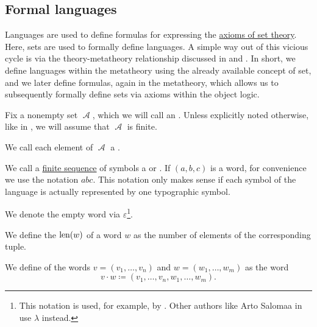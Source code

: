 \subsection{Formal languages}\label{subsec:formal_languages}

Languages are used to define formulas for expressing the \hyperref[def:zfc]{axioms of set theory}. Here, sets are used to formally define languages. A simple way out of this vicious cycle is via the theory-metatheory relationship discussed in  and . In short, we define languages within the metatheory using the already available concept of set, and we later define formulas, again in the metatheory, which allows us to subsequently formally define sets via axioms within the object logic.

\begin{definition}\label{def:formal_language}
  Fix a nonempty set \( \mscrA \), which we will call an . Unless explicitly noted otherwise, like in , we will assume that \( \mscrA \) is finite.

  \begin{thmenum}
     We call each element of \( \mscrA \) a .

     We call a \hyperref[def:sequence]{finite sequence} of symbols a  or . If \( (a, b, c) \) is a word, for convenience we use the notation \( abc \). This notation only makes sense if each symbol of the language is actually represented by one typographic symbol.

     We denote the empty word via \( \varepsilon \)\footnote{This notation is used, for example, by \cite[9]{Savage1998}. Other authors like Arto Salomaa in \cite[3]{Salomaa1987} use \( \lambda \) instead.}.

     We define the  \( \operatorname{len}(w) \) of a word \( w \) as the number of elements of the corresponding tuple.

     We define  of the words \( v = (v_1, \ldots, v_n) \) and \( w = (w_1, \ldots, w_m) \) as the word
    \begin{equation*}
      v \cdot w \coloneqq (v_1, \ldots, v_n, w_1, \ldots, w_m).
    \end{equation*}


\end{thmenum}
\end{definition}
